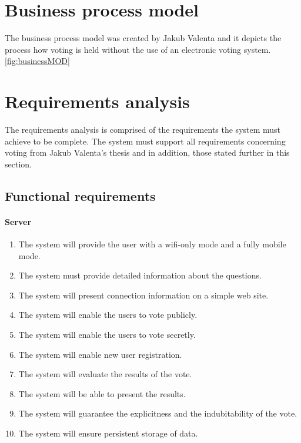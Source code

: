 \documentclass[11pt,twoside,a4paper]{book}
\begin{document}
\section{Business process model}
The business process model was created by Jakub Valenta and it depicts the process how voting is held without the use of an electronic voting system. \cite{bakalarkaJV} \ref{fig:businessMOD}

\section{Requirements analysis}
The requirements analysis is comprised of the requirements the system must achieve to be complete. The system must support all requirements concerning voting from Jakub Valenta's thesis and in addition, those stated further in this section.
\subsection{Functional requirements}
\paragraph*{Server}

\begin{enumerate}

\item  The system will provide the user with a wifi-only mode and a fully mobile mode.
\item  The system must provide detailed information about the questions.
\item  The system will present connection information on a simple web site.
\item  The system will enable the users to vote publicly. \cite{bakalarkaJV}
\item  The system will enable the users to vote secretly. \cite{bakalarkaJV}
\item  The system will enable new user registration. \cite{bakalarkaJV}
\item The system will evaluate the results of the vote.\cite{bakalarkaJV}
\item The system will be able to present the results.\cite{bakalarkaJV}
\item The system will guarantee the explicitness and the indubitability of the vote. \cite{bakalarkaJV}
\item The system will ensure persistent storage of data. \cite{bakalarkaJV}
\end{enumerate}
\end{document}
